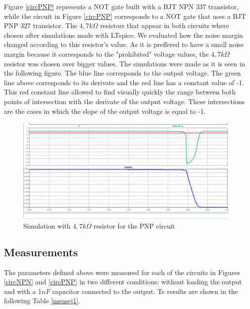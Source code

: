 Figure \ref{circPNP} represents a NOT gate built with a BJT NPN 337 transistor, while the circuit in Figure \ref{circPNP} corresponds to a NOT gate that uses a BJT PNP 327 transistor. The $4,7k{\Omega}$ resistors that appear in both circuits where chosen after simulations made with LTspice. We evaluated how the noise margin changed according to this resistor's value. As it is preffered to have a small noise margin because it corresponds to the "prohibited" voltage values, the $4,7k{\Omega}$ resistor was chosen over bigger values. The simulations were made as it is seen in the following figure. The blue line corresponds to the output voltage. The green line above corresponds to its derivate and the red line has a constant value of -1. This red constant line allowed to find visually quickly the range between both points of intersection with the derivate of the output voltage. These intersections are the cases in which the slope of the output voltage is equal to -1.

\begin{figure}[h!]
\centering
\includegraphics[scale=0.3]{../Exercise1/4k7simulacion}
\caption{Simulation with $4,7k{\Omega}$ resistor for the PNP circuit}
\label{simpnp}
\end{figure}

\subsection{\color{purple}Measurements}

The parameters defined above were measured for each of the circuits in Figures \ref{circNPN} and \ref{circPNP} in two different conditions: without loading the output and with a $1 nF$ capacitor connected to the output. Te results are shown in the following Table \ref {measej1}. \\

